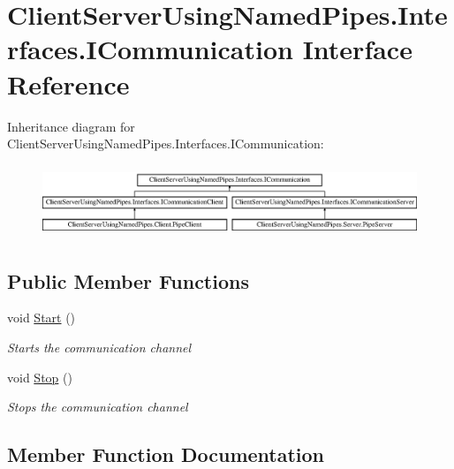 \hypertarget{interface_client_server_using_named_pipes_1_1_interfaces_1_1_i_communication}{}\section{Client\+Server\+Using\+Named\+Pipes.\+Interfaces.\+I\+Communication Interface Reference}
\label{interface_client_server_using_named_pipes_1_1_interfaces_1_1_i_communication}
Inheritance diagram for Client\+Server\+Using\+Named\+Pipes.\+Interfaces.\+I\+Communication\+:\begin{figure}[H]
\begin{center}
\leavevmode
\includegraphics[height=2.193212cm]{interface_client_server_using_named_pipes_1_1_interfaces_1_1_i_communication}
\end{center}
\end{figure}
\subsection*{Public Member Functions}
\begin{DoxyCompactItemize}
\item 
void \hyperlink{interface_client_server_using_named_pipes_1_1_interfaces_1_1_i_communication_ac06ad36a2b8a02d82e385e0eade28671}{Start} ()
\begin{DoxyCompactList}\small\item\em Starts the communication channel \end{DoxyCompactList}\item 
void \hyperlink{interface_client_server_using_named_pipes_1_1_interfaces_1_1_i_communication_a85ce939996cde20d398e799ca6a900f3}{Stop} ()
\begin{DoxyCompactList}\small\item\em Stops the communication channel \end{DoxyCompactList}\end{DoxyCompactItemize}


\subsection{Member Function Documentation}
\mbox{\label{interface_client_server_using_named_pipes_1_1_interfaces_1_1_i_communication_ac06ad36a2b8a02d82e385e0eade28671}} 
